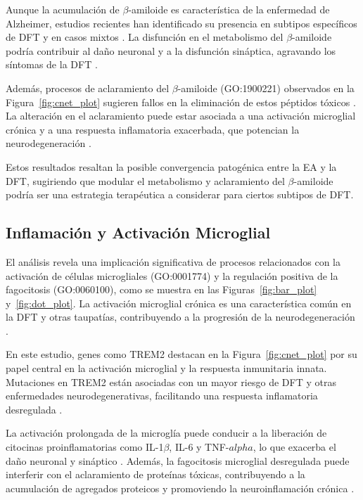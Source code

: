 Aunque la acumulación de \(\beta\)-amiloide es característica de la enfermedad de Alzheimer, estudios recientes han identificado su presencia en subtipos específicos de DFT y en casos mixtos \cite{hardy2002amyloid, ling2010frontotemporal}. La disfunción en el metabolismo del \(\beta\)-amiloide podría contribuir al daño neuronal y a la disfunción sináptica, agravando los síntomas de la DFT \cite{selkoe2002alzheimers}.

Además, procesos de aclaramiento del \(\beta\)-amiloide (GO:1900221) observados en la Figura~\ref{fig:cnet_plot} sugieren fallos en la eliminación de estos péptidos tóxicos \cite{heneka2015neuroinflammation}. La alteración en el aclaramiento puede estar asociada a una activación microglial crónica y a una respuesta inflamatoria exacerbada, que potencian la neurodegeneración \cite{chen2016microglia}.

Estos resultados resaltan la posible convergencia patogénica entre la EA y la DFT, sugiriendo que modular el metabolismo y aclaramiento del \(\beta\)-amiloide podría ser una estrategia terapéutica a considerar para ciertos subtipos de DFT.


\subsection{Inflamación y Activación Microglial}

El análisis revela una implicación significativa de procesos relacionados con la activación de células microgliales (GO:0001774) y la regulación positiva de la fagocitosis (GO:0060100), como se muestra en las Figuras~\ref{fig:bar_plot} y~\ref{fig:dot_plot}. La activación microglial crónica es una característica común en la DFT y otras taupatías, contribuyendo a la progresión de la neurodegeneración \cite{heneka2015neuroinflammation, rajendran2009microglia}.

En este estudio, genes como TREM2 destacan en la Figura~\ref{fig:cnet_plot} por su papel central en la activación microglial y la respuesta inmunitaria innata. Mutaciones en TREM2 están asociadas con un mayor riesgo de DFT y otras enfermedades neurodegenerativas, facilitando una respuesta inflamatoria desregulada \cite{yeh2016trem2, ulland2017trem2}.

La activación prolongada de la microglía puede conducir a la liberación de citocinas proinflamatorias como IL-1\(\beta\), IL-6 y TNF-\(alpha\), lo que exacerba el daño neuronal y sináptico \cite{block2007microglia}. Además, la fagocitosis microglial desregulada puede interferir con el aclaramiento de proteínas tóxicas, contribuyendo a la acumulación de agregados proteicos y promoviendo la neuroinflamación crónica \cite{lull2010microglial}.

